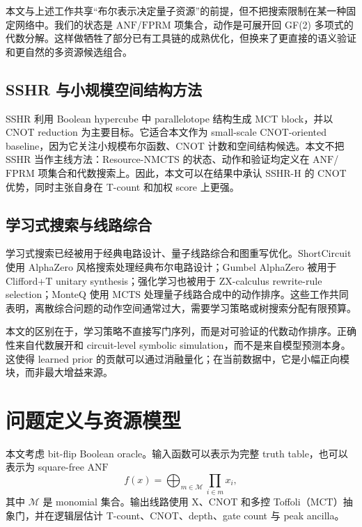 \documentclass[UTF8,fontset=macnew,11pt]{ctexart}
\newcommand{\method}{Resource-NMCTS}
\newcommand{\anf}{\ensuremath{\mathrm{ANF}}}
\newcommand{\fprm}{\ensuremath{\mathrm{FPRM}}}
\newcommand{\mcts}{\ensuremath{\mathrm{MCTS}}}
\newcommand{\mct}{\ensuremath{\mathrm{MCT}}}
\newcommand{\ttable}{truth table}
\begin{document}
本文与上述工作共享“布尔表示决定量子资源”的前提，但不把搜索限制在某一种固定网络中。我们的状态是 \anf{}/\fprm{} 项集合，动作是可展开回 GF(2) 多项式的代数分解。这样做牺牲了部分已有工具链的成熟优化，但换来了更直接的语义验证和更自然的多资源候选组合。

\subsection{SSHR 与小规模空间结构方法}

SSHR 利用 Boolean hypercube 中 parallelotope 结构生成 MCT block，并以 CNOT reduction 为主要目标\cite{zheng2025sshr}。它适合本文作为 small-scale CNOT-oriented baseline，因为它关注小规模布尔函数、CNOT 计数和空间结构候选。本文不把 SSHR 当作主线方法：\method{} 的状态、动作和验证均定义在 \anf{}/\fprm{} 项集合和代数搜索上。因此，本文可以在结果中承认 SSHR-H 的 CNOT 优势，同时主张自身在 T-count 和加权 score 上更强。

\subsection{学习式搜索与线路综合}

学习式搜索已经被用于经典电路设计、量子线路综合和图重写优化。ShortCircuit 使用 AlphaZero 风格搜索处理经典布尔电路设计\cite{tsaras2024shortcircuit}；Gumbel AlphaZero 被用于 Clifford+T unitary synthesis\cite{rietsch2024unitary}；强化学习也被用于 ZX-calculus rewrite-rule selection\cite{riu2025rlzx}；MonteQ 使用 \mcts{} 处理量子线路合成中的动作排序\cite{machiya2026monteq}。这些工作共同表明，离散综合问题的动作空间通常过大，需要学习策略或树搜索分配有限预算。

本文的区别在于，学习策略不直接写门序列，而是对可验证的代数动作排序。正确性来自代数展开和 circuit-level symbolic simulation，而不是来自模型预测本身。这使得 learned prior 的贡献可以通过消融量化；在当前数据中，它是小幅正向模块，而非最大增益来源。

\section{问题定义与资源模型}

本文考虑 bit-flip Boolean oracle。输入函数可以表示为完整 \ttable{}，也可以表示为 square-free \anf{}
\begin{equation}
  f(x)=\bigoplus_{m\in\mathcal{M}}\prod_{i\in m}x_i ,
  \label{eq:anf}
\end{equation}
其中 $\mathcal{M}$ 是 monomial 集合。输出线路使用 X、CNOT 和多控 Toffoli（\mct{}）抽象门，并在逻辑层估计 T-count、CNOT、depth、gate count 与 peak ancilla。
\end{document}

